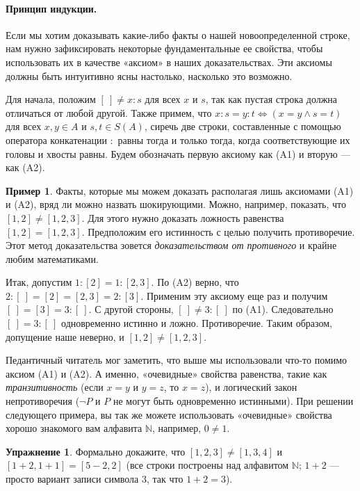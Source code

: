\documentclass[12pt,notitlepage]{article}
\theoremstyle{plain}
\theoremstyle{definition}
\newtheorem{exc}[thm]{Упражнение}
\newtheorem{exm}[thm]{Пример}
\theoremstyle{plain}
\newcommand{\N}{\mathbb{N}}
\newcommand{\1}{\mathbf{1}}
\newcommand{\0}{\mathbf{0}}
\begin{document}
\paragraph{Принцип индукции.} Если мы хотим доказывать какие-либо факты о нашей новоопределенной строке, нам нужно зафиксировать некоторые фундаментальные ее свойства, чтобы использовать их в качестве «аксиом» в наших доказательствах. Эти аксиомы должны быть интуитивно ясны настолько, насколько это возможно.

Для начала, положим $[\ ] \neq x : s$ для всех $x$ и $s$, так как пустая строка должна отличаться от любой другой. Также примем, что $x : s = y : t \iff (x = y \wedge s = t)$ для всех $x, y \in A$ и $s, t \in S(A)$, сиречь две строки, составленные с помощью оператора конкатенации $:$ равны тогда и только тогда, когда соответствующие их головы и хвосты равны. Будем обозначать первую аксиому как (A1) и вторую --- как (A2).

\begin{exm}
	Факты, которые мы можем доказать располагая лишь аксиомами (A1) и (A2), вряд ли можно назвать шокирующими. Можно, например, показать, что $[1,2] \neq [1,2,3]$. Для этого нужно доказать ложность равенства $[1,2] = [1,2,3]$. Предположим его истинность с целью получить противоречие. Этот метод доказательства зовется \emph{доказательством от противного} и крайне любим математиками.
	
	Итак, допустим  $1:[2] = 1:[2,3]$. По (A2) верно, что $2 : [\ ] = [2] = [2,3] = 2 : [3]$. Применим эту аксиому еще раз и получим $[\ ] = [3] = 3 : [\ ]$. С другой стороны, $[\ ] \neq 3 : [\ ]$ по (A1). Следовательно $[\ ] = 3 : [\ ]$ одновременно истинно и ложно. Противоречие. Таким образом, допущение наше неверно, и $[1,2] \neq [1,2,3]$.
	
	Педантичный читатель мог заметить, что выше мы использовали что-то помимо аксиом (A1) и (A2). А именно, «очевидные» свойства равенства, такие как \emph{транзитивность} (если $x = y$ и $y = z$, то $x = z$), и логический закон непротиворечия ($\neg P$ и $P$ не могут быть одновременно истинными). При решении следующего примера, вы так же можете использовать «очевидные» свойства хорошо знакомого вам алфавита $\N$, например, $0 \neq 1$.
\end{exm}

\begin{exc}
	Формально докажите, что $[1,2,3] \neq [1,3,4]$ и $[1 + 2, 1 + 1] = [5 - 2, 2]$ (все строки построены над алфавитом $\N$; $1 + 2$ --- просто вариант записи символа $3$, так что $1 + 2 = 3$).
\end{exc}
\end{document}
